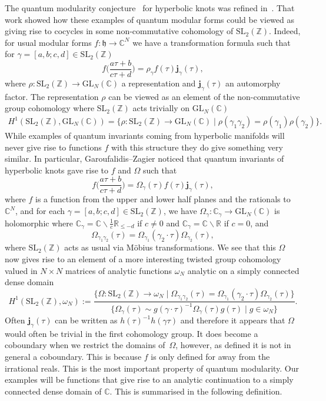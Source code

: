 \documentclass[pdftex]{sigma}
\numberwithin{equation}{section}
\def\BZ{\mathbb{Z}}
\def\BR{\mathbb{R}}
\def\BC{\mathbb{C}}
\def\SL{\mathrm{SL}}
\def\SL{\mathrm{SL}}
\def\GL{\mathrm{GL}}
\def\UHP{\mathfrak{h}}
\def\Om{\Omega}
\def\BZ{\mathbb Z}
\def\BR{\mathbb R}
\def\BC{\mathbb C}
\def\SL{\mathrm{SL}}
\def\GL{\mathrm{GL}}
\def\Om{\Omega}
\begin{document}
The quantum modularity conjecture~\cite{Zagier:Qmod} for hyperbolic knots was refined in~\cite{GZ:RQMOD}. That work showed how these examples of quantum modular forms could be viewed as giving rise to cocycles in some non-commutative cohomology of $\SL_{2}(\BZ)$. Indeed, for usual modular forms $f\colon \UHP\rightarrow\BC^{N}$ we have a transformation formula such that for $\gamma=[a,b;c,d]\in\SL_{2}(\BZ)$
\[
 f\biggl(\frac{a\tau+b}{c\tau+d}\biggr)
  =
 \rho_{\gamma} f(\tau) \mathbf{j}_{\gamma}(\tau) ,
\]
where $\rho\colon \SL_{2}(\BZ)\rightarrow\GL_{N}(\BC)$ a representation and $\mathbf{j}_{\gamma}(\tau)$ an automorphy factor. The representation $\rho$ can be viewed as an element of the non-commutative group cohomology where $\SL_{2}(\BZ)$ acts trivially on $\GL_{N}(\BC)$
\begin{gather*}%
 H^{1}(\SL_{2}(\BZ),\GL_{N}(\BC))
  =
 \{\rho\colon \SL_{2}(\BZ)\rightarrow\GL_{N}(\BC)\mid
 \rho(\gamma_{1}\gamma_{2})
  =
 \rho(\gamma_{1})\rho(\gamma_{2})\}.
\end{gather*}
While examples of quantum invariants coming from hyperbolic manifolds will never give rise to functions $f$ with this structure they do give something very similar. In particular, Garoufalidis--Zagier noticed that quantum invariants of hyperbolic knots gave rise to $f$ and $\Omega$ such that
\[
 f\biggl(\frac{a\tau+b}{c\tau+d}\biggr)
  =
 \Om_{\gamma}(\tau) f(\tau) \mathbf{j}_{\gamma}(\tau) ,
\]
where $f$ is a function from the upper and lower half planes and the rationals to $\BC^{N}$, and for each $\gamma=[a,b;c,d]\in\SL_{2}(\BZ)$, we have $\Om_{\gamma}\colon \BC_{\gamma}\rightarrow\GL_{N}(\BC)$ is holomorphic where
$\BC_{\gamma}=\BC\smallsetminus \frac{1}{c}\BR_{\leq-d}$
if $c\neq0$ and $\BC_{\gamma}=\BC\smallsetminus \BR$ if $c=0$, and
\[
 \Om_{\gamma_1\gamma_2}(\tau)
  =
 \Om_{\gamma_1}(\gamma_2\cdot\tau)\Om_{\gamma_2}(\tau) ,
\]
where $\SL_{2}(\BZ)$ acts as usual via M\"obius transformations. We see that this $\Om$ now gives rise to an element of a more interesting twisted group cohomology valued in $N\times N$ matrices of analytic functions $\omega_N$ analytic on a simply connected dense domain
\[
 H^{1}(\SL_{2}(\BZ),\omega_N)
 :=
 \frac{\{\Om\colon \SL_{2}(\BZ)\rightarrow\omega_N \mid
 \Om_{\gamma_1\gamma_2}(\tau)
  =
 \Om_{\gamma_1}(\gamma_2\cdot\tau)\Om_{\gamma_2}(\tau)\}}
 {\{\Om_{\gamma}(\tau)\sim g(\gamma\cdot\tau)^{-1}\Omega_{\gamma}(\tau)g(\tau)\mid
 g\in\omega_{N}\}} .
\]
Often $\mathbf{j}_{\gamma}(\tau)$ can be written as $h(\tau)^{-1}h(\gamma\tau)$ and therefore it appears that $\Omega$ would often be trivial in the first cohomology group. It does become a coboundary when we restrict the domains of~$\Omega$, however, as defined it is not in general a coboundary. This is because $f$ is only defined for away from the irrational reals. This is the most important property of quantum modularity. Our examples will be functions that give rise to an analytic continuation to a simply connected dense domain of $\BC$. This is summarised in the following definition.
\end{document}
